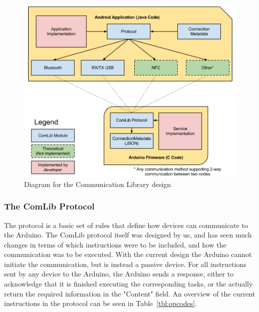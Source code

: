 \begin{figure}[h!]
	\centering \includegraphics[scale=0.4]{img/comlib-diagram.png}
	\caption{Diagram for the Communication Library design}
	\label{fig:comlib-diagram}
\end{figure}

\subsubsection{The ComLib Protocol}
The protocol is a basic set of rules that define how devices can communicate to the Arduino.
The ComLib protocol itself was designed by us, and has seen much changes in terms of which instructions were to be included,
and how the communication was to be executed. With the current design the Arduino cannot initiate the communication,
but is instead a passive device. For all instructions sent by any device to the Arduino, the Arduino sends a response,
either to acknowledge that it is finished executing the corresponding tasks, or the actually return the required
information in the "Content" field. An overview of the current instructions in the protocol can be seen in Table~\ref{tbl:opcodes}.


